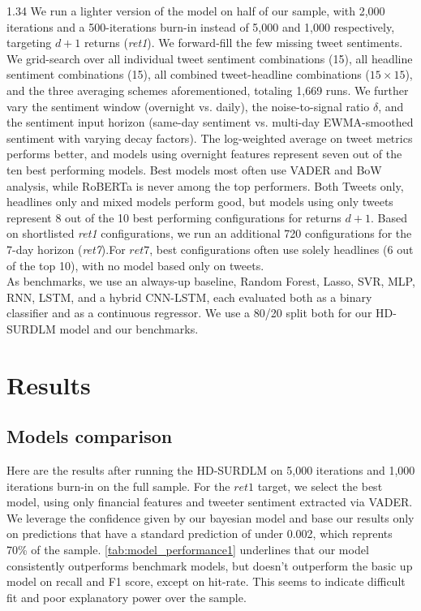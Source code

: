\documentclass{article}
\begin{document}
\begin{setstretch}{1.34}
We run a lighter version of the model on half of our sample, with 2,000 iterations and a 500-iterations burn-in instead of 5,000 and 1,000 respectively, targeting $d+1$ returns (\textit{ret1}). We forward-fill the few missing tweet sentiments. We grid-search over all individual tweet sentiment combinations (15), all headline sentiment combinations (15), all combined tweet-headline combinations ($15 \times 15$), and the three averaging schemes aforementioned, totaling 1,669 runs. We further vary the sentiment window (overnight vs. daily), the noise-to-signal ratio $\delta$, and the sentiment input horizon (same-day sentiment vs. multi-day EWMA-smoothed sentiment with varying decay factors).  The log-weighted average on tweet metrics performs better, and models using overnight features represent seven out of the ten best performing models. Best models most often use VADER and BoW analysis, while RoBERTa is never among the top performers. Both Tweets only, headlines only and mixed models perform good, but models using only tweets represent 8 out of the 10 best performing configurations for returns $d+1$. Based on shortlisted \textit{ret1} configurations, we run an additional 720 configurations for the 7-day horizon (\textit{ret7}).For $ret7$, best configurations often use solely headlines (6 out of the top 10), with no model based only on tweets.  \\

As benchmarks, we use an always-up baseline, Random Forest, Lasso, SVR, MLP, RNN, LSTM, and a hybrid CNN-LSTM, each evaluated both as a binary classifier and as a continuous regressor. We use a 80/20 split both for our HD-SURDLM model and our benchmarks.\\


\section{Results}

\subsection{Models comparison}
Here are the results after running the HD-SURDLM on 5,000 iterations and 1,000 iterations burn-in on the full sample. For the $ret1$ target, we select the best model, using only financial features and tweeter sentiment extracted via VADER. We leverage the confidence given by our bayesian model and base our results only on predictions that have a standard prediction of under 0.002, which reprents 70\% of the sample. \autoref{tab:model_performance1} underlines that our model consistently outperforms benchmark models, but doesn't outperform the basic up model on recall and F1 score, except on hit-rate. This seems to indicate difficult fit and poor explanatory power over the sample. \\


\end{setstretch}
\end{document}
